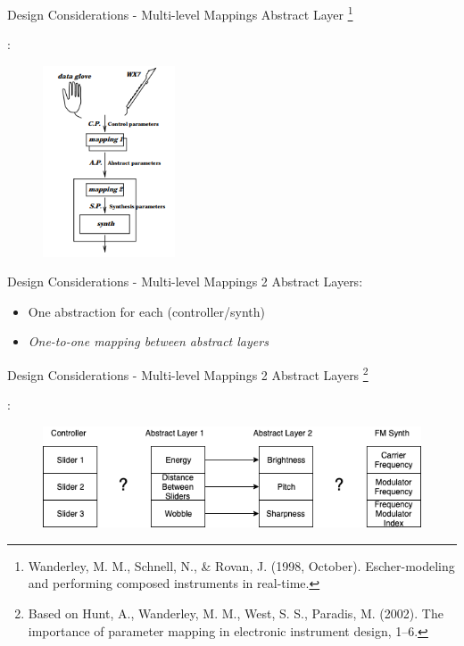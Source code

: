 \documentclass{beamer}
\newcommand\blfootnote[1]{%
  \begingroup
  \renewcommand\thefootnote{}\footnote{#1}%
  \addtocounter{footnote}{-1}%
  \endgroup
}
\begin{document}
\begin{frame}{Design Considerations - Multi-level Mappings}
    Abstract Layer\blfootnote{Wanderley, M. M., Schnell, N., \& Rovan, J. (1998, October). Escher-modeling and performing composed instruments in real-time.}:
    \begin{figure}[h]
        \includegraphics[width=0.35\textwidth]{escher_mapping.png}
    \end{figure}
\end{frame}

\begin{frame}{Design Considerations - Multi-level Mappings}
    2 Abstract Layers: 
    \begin{itemize}
        \item One abstraction for each (controller/synth)
        \item \textit{One-to-one mapping between abstract layers}
    \end{itemize}
\end{frame}

\begin{frame}{Design Considerations - Multi-level Mappings}
    2 Abstract Layers\blfootnote{Based on Hunt, A., Wanderley, M. M., West, S. S., Paradis, M. (2002). The importance of parameter mapping in electronic instrument design, 1–6.}:
    \begin{figure}[h]
        \includegraphics[width=\textwidth]{hunt_2_abstract_layers.png}
    \end{figure}
\end{frame}
\end{document}
